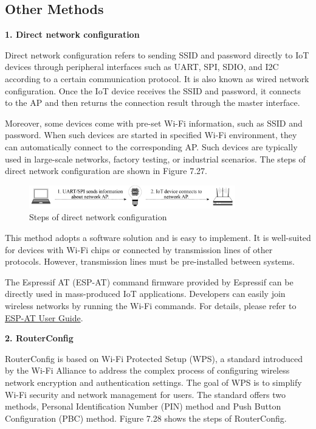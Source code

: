 \documentclass[a4paper,12pt,openany]{book}
\begin{document}
\subsection{Other Methods}
\textbf{1. Direct network configuration}

Direct network configuration refers to sending SSID and password directly to IoT devices through peripheral interfaces such as UART, SPI, SDIO, and I2C according to a certain communication protocol. It is also known as wired network configuration. Once the IoT device receives the SSID and password, it connects to the AP and then returns the connection result through the master interface.

Moreover, some devices come with pre-set Wi-Fi information, such as SSID and password. When such devices are started in specified Wi-Fi environment, they can automatically connect to the corresponding AP. Such devices are typically used in large-scale networks, factory testing, or industrial scenarios. The steps of direct network configuration are shown in Figure 7.27.

\begin{figure}[!h]
    \centering
    \includegraphics[width=0.8\textwidth]{D7Z/7-27}
    \caption{Steps of direct network configuration}
\end{figure}

This method adopts a software solution and is easy to implement. It is well-suited for devices with Wi-Fi chips or connected by transmission lines of other protocols. However, transmission lines must be pre-installed between systems.

The Espressif AT (ESP-AT) command firmware provided by Espressif can be directly used in mass-produced IoT applications. Developers can easily join wireless networks by running the Wi-Fi commands. For details, please refer to \href{https://docs.espressif.com/projects/esp-at/en/latest/esp32/index.html}{ESP-AT User Guide}.

\textbf{2. RouterConfig}

RouterConfig is based on Wi-Fi Protected Setup (WPS), a standard introduced by the Wi-Fi Alliance to address the complex process of configuring wireless network encryption and authentication settings. The goal of WPS is to simplify Wi-Fi security and network management for users. The standard offers two methods, Personal Identification Number (PIN) method and Push Button Configuration (PBC) method. Figure 7.28 shows the steps of RouterConfig.
\end{document}
